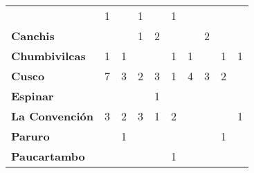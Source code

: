 \begin{tabular}{lccccccccc}
	& 1                 &\cellcolor[HTML]{FCC46C}                                   &1                     
	& \cellcolor[HTML]{FCC46C}                   & 1                   &\cellcolor[HTML]{FCC46C}                                        & \cellcolor[HTML]{FCC46C} \\
	\textbf{Canchis}    & \cellcolor[HTML]{FCC46C}                   & \cellcolor[HTML]{FCC46C}  
	& 1                 &2                  & \cellcolor[HTML]{FCC46C}                   & \cellcolor[HTML]{FCC46C}                &2                  & \cellcolor[HTML]{FCC46C}                   & \cellcolor[HTML]{FCC46C} \\
	\textbf{Chumbivilcas}  & 1                   & 1                 & \cellcolor[HTML]{FCC46C}                                         & \cellcolor[HTML]{FCC46C}                     &1                     & 1                                       & \cellcolor[HTML]{FCC46C}                                         &1                   & \multicolumn{1}{l}{1}    \\
	\textbf{Cusco}         &7                    & 3 				 & 2                  & 3                    & 1                                            & 4                 & 3                  & 2                   &\cellcolor[HTML]{FCC46C}    \\
	\textbf{Espinar}       & \cellcolor[HTML]{FCC46C}                & \cellcolor[HTML]{FCC46C}  &\cellcolor[HTML]{FCC46C}                     & 1                & \cellcolor[HTML]{FCC46C}                                   & \cellcolor[HTML]{FCC46C}                    & \cellcolor[HTML]{FCC46C}                     &\cellcolor[HTML]{FCC46C}                     & \cellcolor[HTML]{FCC46C} \\
	\textbf{La Convención} &3                     & 2 				 & 3                                            &1                     &2                     & \cellcolor[HTML]{FCC46C}               & \cellcolor[HTML]{FCC46C}                      & \cellcolor[HTML]{FCC46C}               &1 \\
	\textbf{Paruro}        & \cellcolor[HTML]{FCC46C}                & 1 						&\cellcolor[HTML]{FCC46C}                     & \cellcolor[HTML]{FCC46C}              &\cellcolor[HTML]{FCC46C}                     & \cellcolor[HTML]{FCC46C}              &\cellcolor[HTML]{FCC46C}                     &1                   				  &\cellcolor[HTML]{FCC46C}    \\
	\textbf{Paucartambo}   & \cellcolor[HTML]{FCC46C}                & \cellcolor[HTML]{FCC46C}  & \cellcolor[HTML]{FCC46C}                     & \cellcolor[HTML]{FCC46C}                      & 1                     & \cellcolor[HTML]{FCC46C}                     & \cellcolor[HTML]{FCC46C}                      & \cellcolor[HTML]{FCC46C}                     & \cellcolor[HTML]{FCC46C} \\

\end{tabular}
